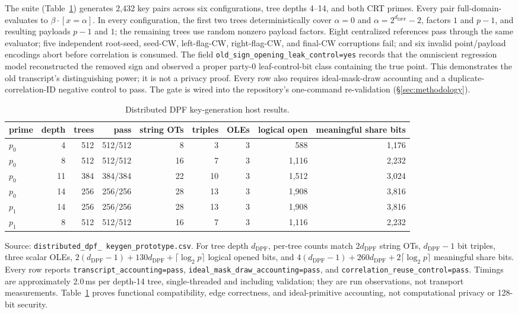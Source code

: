 \documentclass[11pt]{article}
\newcommand{\dpfd}{d_{\mathrm{DPF}}} %
\begin{document}
The suite (Table~\ref{tab:m1proto}) generates 2{,}432 key pairs across six
configurations, tree depths 4--14, and both CRT primes. Every pair
full-domain-evaluates to $\beta\cdot[x{=}\alpha]$. In every configuration,
the first two trees deterministically cover $\alpha=0$ and
$\alpha=2^{\dpfd}-2$, factors $1$ and $p-1$, and resulting payloads $p-1$ and
$1$; the remaining trees use random nonzero payload factors. Eight centralized
references pass through the same evaluator; five independent root-seed,
seed-CW, left-flag-CW, right-flag-CW, and final-CW corruptions fail; and six invalid point/payload encodings abort
before correlation is consumed. The field
\texttt{old\_sign\_opening\_leak\_control=yes} records that the omniscient
regression model reconstructed the removed sign and observed a proper
party-0 leaf-control-bit class containing the true point. This demonstrates
the old transcript's distinguishing power; it is not a privacy proof.
Every row also requires ideal-mask-draw accounting and a duplicate-correlation-ID
negative control to pass. The gate is wired into the repository's one-command
re-validation (\S\ref{sec:methodology}).

\begin{table}[ht]
\centering
\small
{\scriptsize
\setlength{\tabcolsep}{3pt}
\begin{tabular}{lrrrrrrrr}
\toprule
prime & depth & trees & pass & string OTs & triples & OLEs & logical open & meaningful share bits\\
\midrule
$p_0$ & 4  & 512 & 512/512 & 8  & 3  & 3 & 588   & 1{,}176\\
$p_0$ & 8  & 512 & 512/512 & 16 & 7  & 3 & 1{,}116 & 2{,}232\\
$p_0$ & 11 & 384 & 384/384 & 22 & 10 & 3 & 1{,}512 & 3{,}024\\
$p_0$ & 14 & 256 & 256/256 & 28 & 13 & 3 & 1{,}908 & 3{,}816\\
$p_1$ & 14 & 256 & 256/256 & 28 & 13 & 3 & 1{,}908 & 3{,}816\\
$p_1$ & 8  & 512 & 512/512 & 16 & 7  & 3 & 1{,}116 & 2{,}232\\
\bottomrule
\end{tabular}
}
\caption{Distributed DPF key-generation host results.}
\label{tab:m1proto}
\end{table}

Source: \texttt{distributed\_\allowbreak dpf\_\allowbreak
keygen\_\allowbreak prototype.csv}. For tree depth $\dpfd$, per-tree counts
match $2\dpfd$ string OTs,
$\dpfd-1$ bit triples, three scalar OLEs,
$2(\dpfd-1)+130\dpfd+\lceil\log_2 p\rceil$ logical opened bits, and
$4(\dpfd-1)+260\dpfd+2\lceil\log_2 p\rceil$ meaningful share bits. Every row
reports \texttt{transcript\_accounting=pass},
\texttt{ideal\_mask\_draw\_\allowbreak accounting=pass}, and
\texttt{correlation\_reuse\_\allowbreak control=pass}. Timings are approximately
2.0\,ms per depth-14 tree, single-threaded and including validation; they are
run observations, not transport measurements. Table~\ref{tab:m1proto} proves
functional compatibility, edge correctness, and ideal-primitive accounting,
not computational privacy or 128-bit security.
\end{document}
